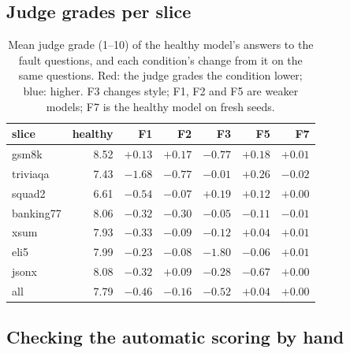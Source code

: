 \documentclass[11pt]{article}
\begin{document}
\subsection{Judge grades per slice}
\label{app:judge}
\begin{table}[h]
  \centering\small
  \caption{Mean judge grade (1--10) of the healthy model's answers to the fault
  questions, and each condition's change from it on the same questions. Red: the
  judge grades the condition lower; blue: higher. F3 changes style; F1, F2 and F5
  are weaker models; F7 is the healthy model on fresh seeds.}
  \begin{tabular}{lrrrrrr}
    \toprule
    slice & healthy & F1 & F2 & F3 & F5 & F7 \\
    \midrule
    \textsf{gsm8k} & 8.52 & \cellcolor{blue!4}$+0.13$ & \cellcolor{blue!6}$+0.17$ & \cellcolor{red!26}$-0.77$ & \cellcolor{blue!6}$+0.18$ & $+0.01$ \\
    \textsf{triviaqa} & 7.43 & \cellcolor{red!56}$-1.68$ & \cellcolor{red!26}$-0.77$ & $-0.01$ & \cellcolor{blue!9}$+0.26$ & $-0.02$ \\
    \textsf{squad2} & 6.61 & \cellcolor{red!18}$-0.54$ & $-0.07$ & \cellcolor{blue!6}$+0.19$ & \cellcolor{blue!4}$+0.12$ & $+0.00$ \\
    \textsf{banking77} & 8.06 & \cellcolor{red!11}$-0.32$ & \cellcolor{red!10}$-0.30$ & $-0.05$ & \cellcolor{red!4}$-0.11$ & $-0.01$ \\
    \textsf{xsum} & 7.93 & \cellcolor{red!11}$-0.33$ & \cellcolor{red!3}$-0.09$ & \cellcolor{red!4}$-0.12$ & $+0.04$ & $+0.01$ \\
    \textsf{eli5} & 7.99 & \cellcolor{red!8}$-0.23$ & \cellcolor{red!3}$-0.08$ & \cellcolor{red!60}$-1.80$ & $-0.06$ & $+0.01$ \\
    \textsf{jsonx} & 8.08 & \cellcolor{red!11}$-0.32$ & \cellcolor{blue!3}$+0.09$ & \cellcolor{red!9}$-0.28$ & \cellcolor{red!22}$-0.67$ & $+0.00$ \\
    \midrule
    all & 7.79 & \cellcolor{red!15}$-0.46$ & \cellcolor{red!5}$-0.16$ & \cellcolor{red!17}$-0.52$ & $+0.04$ & $+0.00$ \\
    \bottomrule
  \end{tabular}
\end{table}

\subsection{Checking the automatic scoring by hand}
\label{app:hand}
\end{document}

